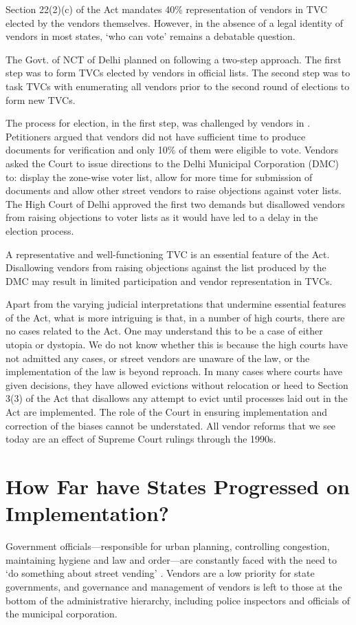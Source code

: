 \documentclass[a4paper, 12pt, twoside]{article}
\begin{document}
{Section 22(2)(c) of the Act mandates 40\% representation of vendors in TVC elected by the vendors themselves. However, in the absence of a legal identity of vendors in most states, `who can vote' remains a debatable question.
 
The Govt. of NCT of Delhi planned on following a two-step approach. The first step was to form TVCs elected by vendors in official lists. The second step was to task TVCs with enumerating all vendors prior to the second round of elections to form new TVCs. 

The process for election, in the first step, was challenged by vendors in \cite{RPKHU}. Petitioners argued that vendors did not have sufficient time to produce documents for verification and only 10\% of them were eligible to vote. Vendors asked the Court to issue directions to the Delhi Municipal Corporation (DMC) to: display the zone-wise voter list, allow for more time for submission of documents and allow other street vendors to raise objections against voter lists. The High Court of Delhi approved the first two demands but disallowed vendors from raising objections to voter lists as it would have led to a delay in the election process. 

A representative and well-functioning TVC is an essential feature of the Act. Disallowing vendors from raising objections against the list produced by the DMC may result in limited participation and vendor representation in TVCs. 

Apart from the varying judicial interpretations that undermine essential features of the Act, what is more intriguing is that, in a number of high courts, there are no cases related to the Act. One may understand this to be a case of either utopia or dystopia. We do not know whether this is because the high courts have not admitted any cases, or street vendors are unaware of the law, or the implementation of the law is beyond reproach. In many cases where courts have given decisions, they have allowed evictions without relocation or heed to Section 3(3) of the Act that disallows any attempt to evict until processes laid out in the Act are implemented. The role of the Court in ensuring implementation and correction of the biases cannot be understated. All vendor reforms that we see today are an effect of Supreme Court rulings through the 1990s. 

\section*{How Far have States Progressed on Implementation?}
	Government officials—responsible for urban planning, controlling congestion, maintaining hygiene and law and order—are constantly faced with the need to `do something about street vending' \parencite{bromleypaper}. Vendors are a low priority for state governments, and governance and management of vendors is left to those at the bottom of the administrative hierarchy, including police inspectors and officials of the municipal corporation.

}
\end{document}
